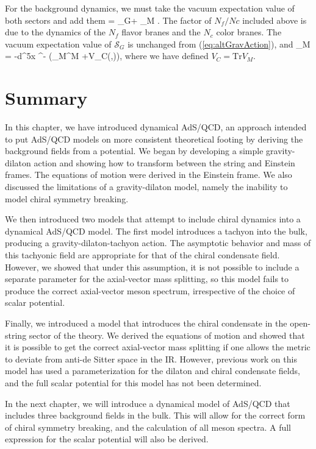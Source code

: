 For the background dynamics, we must take the vacuum expectation value of both sectors and add them
\be
{} = \langle{}_G\rangle + \langle{}_M \rangle.
\ee
The factor of $N_f/Nc$ included above is due to the dynamics of the $N_f$ flavor branes and the $N_c$ color branes. %
The vacuum expectation value of $\mathcal{S}_G$ is unchanged from (\ref{eq:altGravAction}), and 
\be
\langle {}_M \rangle= -\int d^5x \root \EXP^{-\Phi} \left(\thalf \partial_M\chi\partial^M \chi +V_C(\chi,\Phi)\right),
\ee
where we have defined $V_C = \mathrm{Tr} V_M$.

\section{Summary}
In this chapter, we have introduced dynamical AdS/QCD, an approach intended to put AdS/QCD models on more consistent theoretical footing by deriving the background fields from a potential.
We began by developing a simple gravity-dilaton action and showing how to transform between the string and Einstein frames.
The equations of motion were derived in the Einstein frame.
We also discussed the limitations of a gravity-dilaton model, namely the inability to model chiral symmetry breaking.

We then introduced two models that attempt to include chiral dynamics into a dynamical AdS/QCD model. 
The first model introduces a tachyon into the bulk, producing a gravity-dilaton-tachyon action. 
The asymptotic behavior and mass of this tachyonic field are appropriate for that of the chiral condensate field.
However, we showed that under this assumption, it is not possible to include a separate parameter for the axial-vector mass splitting, so this model fails to produce the correct axial-vector meson spectrum, irrespective of the choice of scalar potential.

Finally, we introduced a model that introduces the chiral condensate in the open-string sector of the theory. 
We derived the equations of motion and showed that it is possible to get the correct axial-vector mass splitting if one allows the metric to deviate from anti-de Sitter space in the IR.
However, previous work on this model has used a parameterization for the dilaton and chiral condensate fields, and the full scalar potential for this model has not been determined.

In the next chapter, we will introduce a dynamical model of AdS/QCD that includes three background fields in the bulk.
This will allow for the correct form of chiral symmetry breaking, and the calculation of all meson spectra. 
A full expression for the scalar potential will also be derived.






